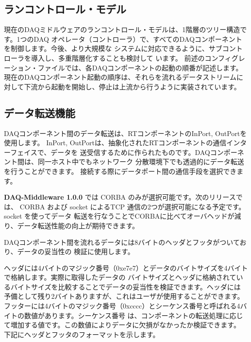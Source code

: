 \documentclass[a4j,10pt,dvips,onecolumn,oneside,final]{jarticle}%
\newcommand {\daqmwcurrent} {
	{\bf DAQ-Middleware 1.0.0}
}
\begin{document}
\subsection{ランコントロール・モデル}\label{runctrl}
現在のDAQミドルウェアのランコントロール・モデルは、1階層のツリー構造です。1つのDAQ
オペレータ（コントローラ）で、すべてのDAQコンポーネントを制御します。今後、より大規模な
システムに対応できるように、サブコントローラを導入し、多重階層化することも検討して
います。
前述のコンフィグレーション・ファイルでは、各DAQコンポーネントの起動の順番が記述します。
現在のDAQコンポーネント起動の順序は、それらを流れるデータストリームに
対して下流から起動を開始し、停止は上流から行うように実装されています。

\subsection{データ転送機能}\label{data-tarans}
DAQコンポーネント間のデータ転送は、RTコンポーネントのInPort, OutPortを使用します。
InPort, OutPortは、抽象化されたRTコンポーネントの通信インターフェイスで、データを
送受信するために作られたものです。DAQコンポーネント間は、同一ホスト中でもネットワーク
分散環境下でも透過的にデータ転送を行うことができます。
接続する際にデータポート間の通信手段を選択できます。
\daqmwcurrent では CORBA のみが選択可能です。次のリリースでは、
CORBA および socket によるTCP 通信の2つが選択可能になる予定です。socket を使ってデータ
転送を行なうことでCORBAに比べてオーバヘッドが減り、データ転送性能の向上が期待できます。

DAQコンポーネント間を流れるデータには8バイトのヘッダとフッタがついており、データの妥当性の
検証に使用します。

ヘッダには4バイトのマジック番号（0xe7e7）とデータのバイトサイズを4バイトで格納します。実際に取得したデータの
バイトサイズとヘッダに格納されているバイトサイズを比較することでデータの妥当性を検証できます。ヘッダには
予備として残り2バイトありますが、これはユーザが使用することができます。
フッターには4バイトのマジック番号（0xcccc）とシーケンス番号と呼ばれる4バイトの数値があります。シーケンス番号
は、コンポーネントの転送処理に応じて増加する値です。この数値によりデータに欠損がなかったか検証できます。
下記にヘッダとフッタのフォーマットを示します。
\end{document}
